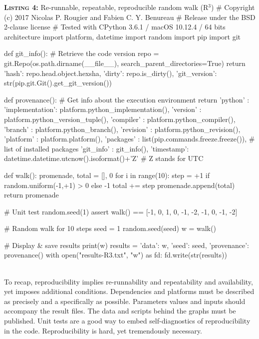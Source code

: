 \documentclass[a4paper,11pt]{article}
\begin{document}
\noindent \begin{minipage}[c]{\linewidth}
\begin{code}{\textbf{\textsc{Listing 4:}} Re-runnable, repeatable, reproducible random walk (R$^3$)}
# Copyright (c) 2017 Nicolas P. Rougier and Fabien C. Y. Benureau
# Release under the BSD 2-clause license
# Tested with CPython 3.6.1 / macOS 10.12.4 / 64 bits architecture
import platform, datetime
import random
import pip
import git

def git_info(): # Retrieve the code version
    repo = git.Repo(os.path.dirname(__file__), search_parent_directories=True)
    return {'hash': repo.head.object.hexsha, 'dirty': repo.is_dirty(),
            'git_version': str(pip.git.Git().get_git_version())}

def provenance(): # Get info about the execution environment
    return {'python'   : {'implementation': platform.python_implementation(),
                          'version'       : platform.python_version_tuple(),
                          'compiler'      : platform.python_compiler(),
                          'branch'        : platform.python_branch(),
                          'revision'      : platform.python_revision()},
            'platform' : platform.platform(),
            'packages'  : list(pip.commands.freeze.freeze()), # list of installed packages
            'git_info' : git_info(),
            'timestamp': datetime.datetime.utcnow().isoformat()+'Z'}  # Z stands for UTC

def walk():
    promenade, total = [], 0
    for i in range(10):
        step = +1 if random.uniform(-1,+1) > 0 else -1
        total += step
        promenade.append(total)
    return promenade

# Unit test
random.seed(1)
assert walk() == [-1, 0, 1, 0, -1, -2, -1, 0, -1, -2]

# Random walk for 10 steps
seed = 1
random.seed(seed)
w = walk()

# Display & save results
print(w)
results = {'data': w, 'seed': seed, 'provenance': provenance()}
with open("results-R3.txt", "w") as fd:
    fd.write(str(results))
\end{code}
\end{minipage}\\

To recap, reproducibility implies re-runnability and repeatability and availability, yet imposes additional conditions. Dependencies and platforms must be described as precisely and a specifically as possible. Parameters values and inputs should accompany the result files. The data and scripts behind the graphs must be published. Unit tests are a good way to embed self-diagnostics of reproducibility in the code. Reproducibility is hard, yet tremendously necessary.
\end{document}
